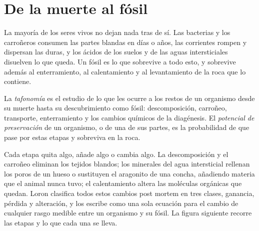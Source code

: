 \section{De la muerte al fósil}\label{sec:b2:palaeoenvironments:taphonomy}

La mayoría de los seres vivos no dejan nada tras de sí. Las bacterias y los carroñeros consumen las partes blandas en
días o años, las corrientes rompen y dispersan las duras, y los ácidos de los suelos y de las aguas intersticiales
disuelven lo que queda. Un fósil es lo que sobrevive a todo esto, y sobrevive además al enterramiento,
al calentamiento y al levantamiento de la roca que lo contiene.

\begin{definition}\label{def:b2:palaeoenvironments:taphonomy}
La \emph{tafonomía} es el estudio de lo que les ocurre a los restos de un organismo
desde su muerte hasta su descubrimiento como fósil: descomposición, carroñeo, transporte, enterramiento y los
cambios químicos de la diagénesis. El \emph{potencial de preservación}
de un organismo, o de una de sus partes, es la probabilidad de que pase por estas etapas
y sobreviva en la roca.
\end{definition}

Cada etapa quita algo, añade algo o cambia algo. La descomposición y el carroñeo eliminan los
tejidos blandos; los minerales del agua intersticial rellenan los poros de un hueso o sustituyen el aragonito de una
concha, añadiendo materia que el animal nunca tuvo; el calentamiento altera las moléculas orgánicas que quedan.
Loron clasifica todos estos cambios post mortem en tres clases, ganancia, pérdida y alteración, y
los escribe como una sola ecuación para el cambio de cualquier rasgo medible entre un organismo y su
fósil. La figura siguiente recorre las etapas y lo que cada una se lleva.

